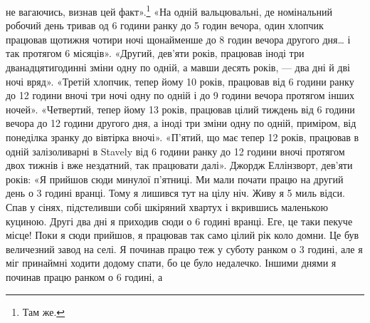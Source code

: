 \parcont{}  %
не вагаючись, визнав цей факт».\footnote{
Там же.
} «На одній вальцювальні, де
номінальний робочий день тривав од 6 години ранку до 5  годин
вечора, один хлопчик працював щотижня чотири ночі щонайменше
до 8 годин вечора другого дня\dots{} і так протягом
6 місяців». «Другий, дев’яти років, працював іноді три дванадцятигодинні
зміни одну по одній, а мавши десять років, — два дні й
дві ночі вряд». «Третій хлопчик, тепер йому 10 років, працював
від 6 години ранку до 12 години вночі три ночі одну по одній і
до 9 години вечора протягом інших ночей». «Четвертий, тепер
йому 13 років, працював цілий тиждень від 6 години вечора до
12 години другого дня, а іноді три зміни одну по одній, приміром,
від понеділка зранку до вівтірка вночі». «П’ятий, що має тепер
12 років, працював в одній залізоливарні в Stavely від 6 години
ранку до 12 години вночі протягом двох тижнів і вже нездатний,
так працювати далі». Джордж Еллінзворт, дев’яти років: «Я прийшов
сюди минулої п’ятниці. Ми мали почати працю на другий
день о 3 годині вранці. Тому я лишився тут на цілу ніч. Живу я
5 миль відси. Спав у сінях, підстеливши собі шкіряний хвартух
і вкрившись маленькою куциною. Другі два дні я приходив сюди
о 6 годині вранці. Еге, це таки пекуче місце! Поки я сюди прийшов,
я працював так само цілий рік коло домни. Це був величезний
завод на селі. Я починав працю теж у суботу ранком о 3 годині, але я міг принаймні ходити додому
спати, бо це було
недалечко. Іншими днями я починав працю ранком о 6 годині, а
